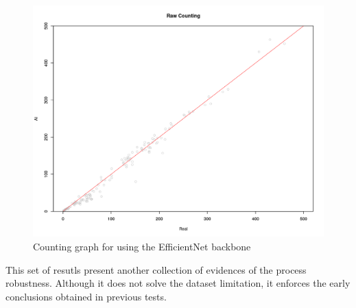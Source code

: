 \begin{figure}[h!]
    \centering
    \includegraphics[width = .8\linewidth]{Figures/counting_aug_en.png}
    \caption{Counting graph for using the EfficientNet backbone}
    \label{fig:counting-en}
\end{figure}

This set of resutls present another collection of evidences of the process robustness. Although it does not solve the dataset limitation, it enforces the early conclusions obtained in previous tests.

\cleardoublepage